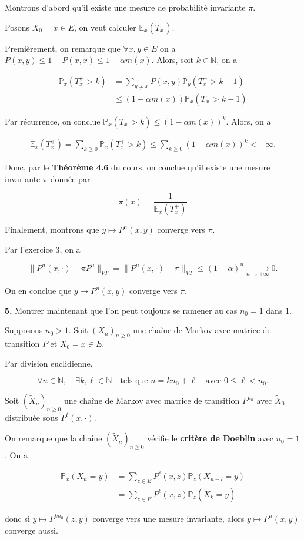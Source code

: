 \documentclass[french]{article}
\begin{document}
	Montrons d'abord qu'il existe une mesure de probabilité invariante $\pi$.
	
	Posons $X_0 = x \in E$, on veut calculer $\mathbb{E}_x(T_x^+)$.
	
	Premièrement, on remarque que $\forall x,y \in E$ on a $P(x,y) \leq 1 - P(x,x) \leq 1 - \alpha m(x)$. Alors, soit $k \in \mathbb{N}$, on a
	
	\begin{align}
		\mathbb{P}_x(T_x^+ > k) &= \sum_{y \not= x} P(x, y)\mathbb{P}_y(T_x^+ > k-1)\\
		&\leq (1 - \alpha m(x)) \mathbb{P}_x(T_x^+ > k - 1)
	\end{align}
	
	Par récurrence, on conclue $\mathbb{P}_x(T_x^+ > k) \leq (1 - \alpha m(x))^k$. Alors, on a
	
	\begin{align}
		\mathbb{E}_x(T_x^+) = \sum_{k \geq 0} \mathbb{P}_x(T_x^+ > k) \leq \sum_{k \geq 0} (1 - \alpha m(x))^k < +\infty.
	\end{align}
	
	Donc, par le \textbf{Théorème 4.6} du cours, on conclue qu'il existe une mesure invariante $\pi$ donnée par
	
	$$ \pi(x) = \frac{1}{\mathbb{E}_x(T_x^+)} $$
	
	Finalement, montrons que $y \mapsto P^n(x,y)$ converge vers $\pi$.
	
	Par l'exercice 3, on a
	
	$$ \| P^n(x, \cdot) - \pi P^n \|_{VT} = \| P^n(x, \cdot) - \pi \|_{VT} \leq (1 - \alpha)^n \xrightarrow[n \to +\infty]{} 0.$$
	
	On en conclue que $y \mapsto P^n(x,y)$ converge vers $\pi$.

	\begin{tcolorbox}[colback=gray!5!white,colframe=gray!75!black]
		\textbf{5.} Montrer maintenant que l’on peut toujours se ramener au cas $n_0 = 1$ dans $1$.
	\end{tcolorbox}

	Supposons $n_0 > 1$. Soit $(X_n)_{n \geq 0}$ une chaîne de Markov avec matrice de transition $P$ et $X_0 = x \in E$.
	
	Par division euclidienne,
	
	$$\forall n \in \mathbb{N}, \quad \exists k,\ell \in \mathbb{N} \quad \text{tels que } n = kn_0 + \ell \quad \text{avec $0 \leq \ell < n_0$}.$$
	
	Soit $(\tilde{X}_n)_{n \geq 0}$ une chaîne de Markov avec matrice de transition $P^{n_0}$ avec $\tilde{X}_0$ distribuée sous $P^{\ell}(x, \cdot)$.
	
	On remarque que la chaîne $(\tilde{X}_n)_{n \geq 0}$ vérifie le \textbf{critère de Doeblin} avec $n_0 = 1$. On a
	
	\begin{align}
	 \mathbb{P}_x(X_n = y) &= \sum_{z \in E} P^\ell(x,z) \mathbb{P}_z(X_{n-l} = y) \\
	 &= \sum_{z \in E} P^\ell(x,z) \mathbb{P}_z(\tilde{X}_{k} = y)
	 \end{align}
	 
	 donc si $y \mapsto P^{kn_0}(z,y)$ converge vers une mesure invariante, alors $y \mapsto P^{n}(x,y)$ converge aussi.
	
\end{document}
